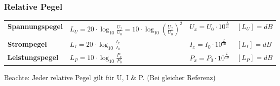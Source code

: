 \begin{minipage}{14.5cm}
	
		\subsubsection{Relative Pegel}
		\begin{tabular}{p{3cm} p{5.5cm} p{2.5cm} p{3cm}}
			\textbf{Spannungspegel}&  
			$L_U = 20 \cdot \log_{10} \frac{U_x}{U_0}= 10 \cdot \log_{10} (\frac{U_x}{U_0})^2$ &
			$U_x = U_0 \cdot 10^{\frac{L}{20}} $ &
			$[L_U] = dB$\\
			
			\textbf{Strompegel}& $L_I  = 20 \cdot \log_{10} \frac{I_x}{I_0}$& $I_x = I_0 \cdot
			10^{\frac{L}{20}} $ & $[L_I] = dB$\\
			
			\textbf{Leistungspegel} & $L_P = 10 \cdot \log_{10} \frac{P_x}{P_0}$ & $P_x = P_0 \cdot
			10^{\frac{L}{10}} $ & $[L_P] = dB$ \\
			
			
			
	\end{tabular}

\end{minipage}


		Beachte: Jeder relative Pegel gilt für U, I \& P. (Bei gleicher Referenz)
